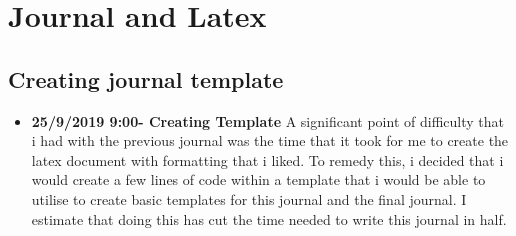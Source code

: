 \documentclass{article}
\begin{document}
\section{Journal and Latex}

\subsection{Creating journal template}
\begin{itemize}
 \item{\textbf{25/9/2019 9:00- Creating Template} A significant point of difficulty that i had with the previous journal was the time that it took for me to create the latex document with formatting that i liked. To remedy this, i decided that i would create a few lines of code within a template that i would be able to utilise to create basic templates for this journal and the final journal. I estimate that doing this has cut the time needed to write this journal in half.}
 
\end{itemize}
\end{document}
